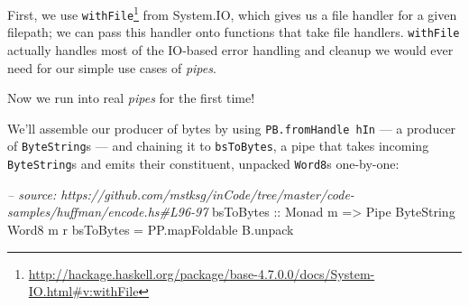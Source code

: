 \documentclass[]{article}
\newenvironment{Shaded}{}{}
\newcommand{\KeywordTok}[1]{\textcolor[rgb]{0.00,0.44,0.13}{\textbf{{#1}}}}
\newcommand{\DataTypeTok}[1]{\textcolor[rgb]{0.56,0.13,0.00}{{#1}}}
\newcommand{\DecValTok}[1]{\textcolor[rgb]{0.25,0.63,0.44}{{#1}}}
\newcommand{\CommentTok}[1]{\textcolor[rgb]{0.38,0.63,0.69}{\textit{{#1}}}}
\newcommand{\OtherTok}[1]{\textcolor[rgb]{0.00,0.44,0.13}{{#1}}}
\newcommand{\FunctionTok}[1]{\textcolor[rgb]{0.02,0.16,0.49}{{#1}}}
\newcommand{\NormalTok}[1]{{#1}}
\renewcommand{\href}[2]{#2\footnote{\url{#1}}}
\begin{document}
\begin{Shaded}
\end{Shaded}

First, we use
\href{http://hackage.haskell.org/package/base-4.7.0.0/docs/System-IO.html\#v:withFile}{\texttt{withFile}}
from System.IO, which gives us a file handler for a given filepath; we
can pass this handler onto functions that take file handlers.
\texttt{withFile} actually handles most of the IO-based error handling
and cleanup we would ever need for our simple use cases of \emph{pipes}.

Now we run into real \emph{pipes} for the first time!

We'll assemble our producer of bytes by using
\texttt{PB.fromHandle\ hIn} --- a producer of \texttt{ByteString}s ---
and chaining it to \texttt{bsToBytes}, a pipe that takes incoming
\texttt{ByteString}s and emits their constituent, unpacked
\texttt{Word8}s one-by-one:

\begin{Shaded}
\begin{Highlighting}[]
\CommentTok{-- source: https://github.com/mstksg/inCode/tree/master/code-samples/huffman/encode.hs#L96-97}
\OtherTok{bsToBytes ::} \DataTypeTok{Monad} \NormalTok{m }\OtherTok{=>} \DataTypeTok{Pipe} \DataTypeTok{ByteString} \DataTypeTok{Word8} \NormalTok{m r}
\NormalTok{bsToBytes }\FunctionTok{=} \NormalTok{PP.mapFoldable B.unpack}
\end{Highlighting}
\end{Shaded}
\end{document}
